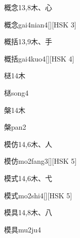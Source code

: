 \begin{entry}{概念}{13,8}{⽊、⼼}
  \begin{phonetics}{概念}{gai4nian4}[][HSK 3]
  \end{phonetics}
\end{entry}

\begin{entry}{概括}{13,9}{⽊、⼿}
  \begin{phonetics}{概括}{gai4kuo4}[][HSK 4]
  \end{phonetics}
\end{entry}

\begin{entry}{㮸}{14}{⽊}
  \begin{phonetics}{㮸}{song4}
  \end{phonetics}
\end{entry}

\begin{entry}{槃}{14}{⽊}
  \begin{phonetics}{槃}{pan2}
  \end{phonetics}
\end{entry}

\begin{entry}{模仿}{14,6}{⽊、⼈}
  \begin{phonetics}{模仿}{mo2fang3}[][HSK 5]
  \end{phonetics}
\end{entry}

\begin{entry}{模式}{14,6}{⽊、⼷}
  \begin{phonetics}{模式}{mo2shi4}[][HSK 5]
  \end{phonetics}
\end{entry}

\begin{entry}{模具}{14,8}{⽊、⼋}
  \begin{phonetics}{模具}{mu2ju4}
  \end{phonetics}
\end{entry}

